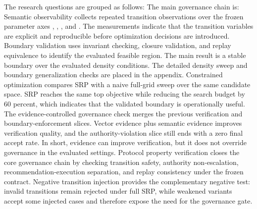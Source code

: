 \markdownRendererUlEndTight \markdownRendererInterblockSeparator
{}The research questions are grouped as follows:\markdownRendererInterblockSeparator
{}\markdownRendererInterblockSeparator
{}\markdownRendererSectionBegin
{}\markdownRendererInterblockSeparator
{}The main governance chain is:\markdownRendererInterblockSeparator
{}\markdownRendererInterblockSeparator
{}Semantic observability collects repeated transition observations over the frozen parameter axes , , , and . The measurements indicate that the transition variables are explicit and reproducible before optimization decisions are introduced.\markdownRendererParagraphSeparator
{}Boundary validation uses invariant checking, closure validation, and replay equivalence to identify the evaluated feasible region. The main result is a stable boundary over the evaluated density conditions. The detailed density sweep and boundary generalization checks are placed in the appendix.\markdownRendererParagraphSeparator
{}Constrained optimization compares SRP with a naive full-grid sweep over the same candidate space. SRP reaches the same top objective while reducing the search budget by 60 percent, which indicates that the validated boundary is operationally useful.\markdownRendererParagraphSeparator
{}The evidence-controlled governance check merges the previous verification and boundary-enforcement slices. Vector evidence plus semantic evidence improves verification quality, and the authority-violation slice still ends with a zero final accept rate. In short, evidence can improve verification, but it does not override governance in the evaluated settings.\markdownRendererParagraphSeparator
{}Protocol property verification closes the core governance chain by checking transition safety, authority non-escalation, recommendation-execution separation, and replay consistency under the frozen contract. Negative transition injection provides the complementary negative test: invalid transitions remain rejected under full SRP, while weakened variants accept some injected cases and therefore expose the need for the governance gate.\markdownRendererParagraphSeparator
